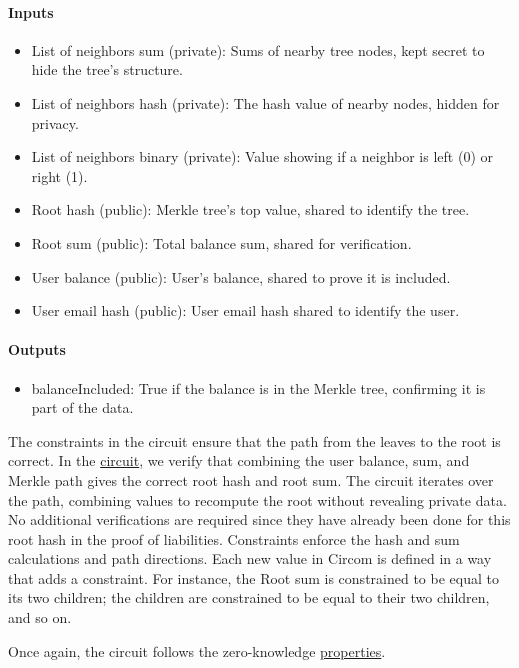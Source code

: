 \paragraph{Inputs}
\begin{itemize}
   \item List of neighbors sum (private): Sums of nearby tree nodes, kept secret to hide the tree's structure.
   \item List of neighbors hash (private): The hash value of nearby nodes, hidden for privacy.
   \item List of neighbors binary (private): Value showing if a neighbor is left (0) or right (1).
   \item Root hash (public): Merkle tree's top value, shared to identify the tree.
   \item Root sum (public): Total balance sum, shared for verification.
   \item User balance (public): User's balance, shared to prove it is included.
   \item User email hash (public): User email hash shared to identify the user.
   \end{itemize}

\paragraph{Outputs}
\begin{itemize}
   \item balanceIncluded: True if the balance is in the Merkle tree, confirming it is part of the data.
   \end{itemize}


The constraints in the circuit ensure that the path from the leaves to the root is correct. 
In the \hyperref[subsec:pic]{circuit}, we verify that combining the user balance, sum, and Merkle path gives the correct root hash and root sum. 
The circuit iterates over the path, combining values to recompute the root without revealing private data. 
No additional verifications are required since they have already been done for this root hash in the proof of liabilities. 
Constraints enforce the hash and sum calculations and path directions. 
Each new value in Circom is defined in a way that adds a constraint. For instance, the Root sum is constrained to be equal to its two children; the children are constrained to be equal to their two children, and so on.

Once again, the circuit follows the zero-knowledge \hyperref[subsec:zkp]{properties}. 

